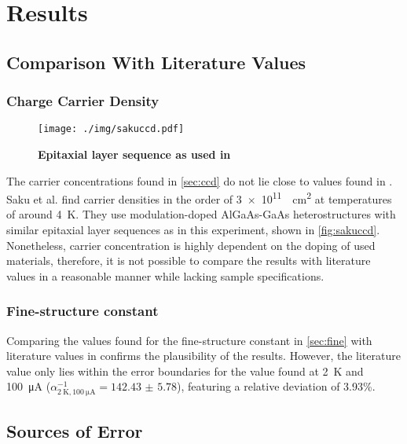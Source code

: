 \chapter{Results}

\section{Comparison With Literature Values} %
\subsection{Charge Carrier Density}
\begin{figure}
	\centering
	\texttt{[image: ./img/sakuccd.pdf]}
	\caption[Epitaxial layer sequence comparison]{\textbf{Epitaxial layer sequence as used in \cite{ccd}}}
	\label{fig:sakuccd}
\end{figure}
The carrier concentrations found in \autoref{sec:ccd} do not lie close to values found in \cite{ccd}.
Saku et al. find carrier densities in the order of \SI{3e11}{\per\centi\meter\squared} at temperatures of around \SI{4}{\kelvin}.
They use modulation-doped AlGaAs-GaAs heterostructures with similar epitaxial layer sequences as in this experiment, shown in \autoref{fig:sakuccd}.
Nonetheless, carrier concentration is highly dependent on the doping of used materials, therefore, it is not possible to compare the results with literature values in a reasonable manner while lacking sample specifications.
  
\subsection{Fine-structure constant}
Comparing the values found for the fine-structure constant in \autoref{sec:fine} with literature values in \cite{NIST} confirms the plausibility of the results.
However, the literature value only lies within the error boundaries for the value found at \SI{2}{\kelvin} and \SI{100}{\micro\ampere} ($\alpha^{-1}_{\SI{2}{\kelvin},\SI{100}{\micro\ampere}} = \num{142.43(578)}$), featuring a relative deviation of \num{3.93}\%.

\section{Sources of Error} %
